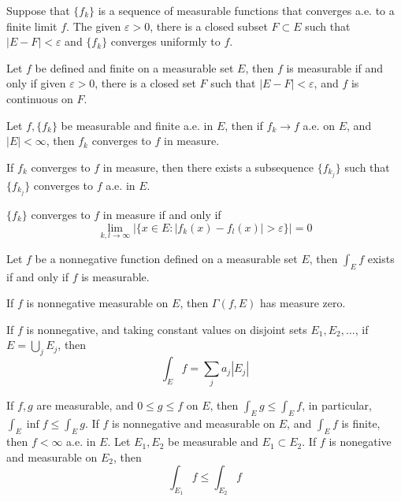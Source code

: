 \documentclass[openany]{book}
\begin{document}
\begin{thm}
    Suppose that $\{f_k\}$ is a sequence of measurable functions that converges a.e. to a finite limit $f$. The given $\varepsilon>0$, there is a closed subset $F\subset E$ such that $|E-F|<\varepsilon$ and $\{f_k\}$ converges uniformly to $f$.
\end{thm}
\begin{thm}
    Let $f$ be defined and finite on a measurable set $E$, then $f$ is measurable if and only if given $\varepsilon>0$, there is a closed set $F$ such that $|E-F|<\varepsilon$, and $f$ is continuous on $F$.
\end{thm}
\begin{thm}
    Let $f, \{f_k\}$ be measurable and finite a.e. in $E$, then if $f_k\to f$ a.e. on $E$, and $|E|<\infty$, then $f_k$ converges to $f$ in measure.
\end{thm}
\begin{thm}
    If $f_k$ converges to $f$ in measure, then there exists a subsequence $\{f_{k_j}\}$ such that $\{f_{k_j}\}$ converges to $f$ a.e. in $E$.
\end{thm}
\begin{thm}
    $\{f_k\}$ converges to $f$ in measure if and only if 
    \begin{equation*}
        \lim_{k,l\to\infty}|\{x\in E: |f_k(x)-f_l(x)|>\varepsilon\}|=0
    \end{equation*}
\end{thm}
\begin{prop}
    Let $f$ be a nonnegative function defined on a measurable set $E$, then $\int_Ef$ exists if and only if $f$ is measurable.
\end{prop}
\begin{prop}
    If $f$ is nonnegative measurable on $E$, then $\Gamma(f,E)$ has measure zero.
\end{prop}
\begin{prop}
    If $f$ is nonnegative, and taking constant values on disjoint sets $E_1,E_2,\dots$, if $E=\bigcup_jE_j$, then 
    \begin{equation*}
        \int_Ef=\sum_ja_j|E_j|
    \end{equation*}
\end{prop}
\begin{prop}
    If $f,g$ are measurable, and $0\leq g\leq f$ on $E$, then $\int_Eg\leq\int_Ef$, in particular, $\int_E\inf f\leq\int_Eg$. If $f$ is nonnegative and measurable on $E$, and $\int_Ef$ is finite, then $f<\infty$ a.e. in $E$. Let $E_1,E_2$ be measurable and $E_1\subset E_2$. If $f$ is nonegative and measurable on $E_2$, then 
    \begin{equation*}
        \int_{E_1}f\leq\int_{E_2}f
    \end{equation*}
\end{prop}
\end{document}
